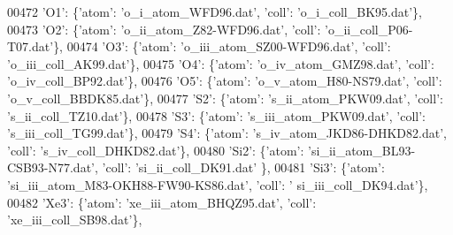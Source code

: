 \begin{DoxyCode}
00472                              \textcolor{stringliteral}{'O1'}: \{\textcolor{stringliteral}{'atom'}: \textcolor{stringliteral}{'o\_i\_atom\_WFD96.dat'}, \textcolor{stringliteral}{'coll'}: \textcolor{stringliteral}{'o\_i\_coll\_BK95.dat'}\},
00473                              \textcolor{stringliteral}{'O2'}: \{\textcolor{stringliteral}{'atom'}: \textcolor{stringliteral}{'o\_ii\_atom\_Z82-WFD96.dat'}, \textcolor{stringliteral}{'coll'}: \textcolor{stringliteral}{'o\_ii\_coll\_P06-T07.dat'}\},
00474                              \textcolor{stringliteral}{'O3'}: \{\textcolor{stringliteral}{'atom'}: \textcolor{stringliteral}{'o\_iii\_atom\_SZ00-WFD96.dat'}, \textcolor{stringliteral}{'coll'}: \textcolor{stringliteral}{'o\_iii\_coll\_AK99.dat'}\},
00475                              \textcolor{stringliteral}{'O4'}: \{\textcolor{stringliteral}{'atom'}: \textcolor{stringliteral}{'o\_iv\_atom\_GMZ98.dat'}, \textcolor{stringliteral}{'coll'}: \textcolor{stringliteral}{'o\_iv\_coll\_BP92.dat'}\},
00476                              \textcolor{stringliteral}{'O5'}: \{\textcolor{stringliteral}{'atom'}: \textcolor{stringliteral}{'o\_v\_atom\_H80-NS79.dat'}, \textcolor{stringliteral}{'coll'}: \textcolor{stringliteral}{'o\_v\_coll\_BBDK85.dat'}\},
00477                              \textcolor{stringliteral}{'S2'}: \{\textcolor{stringliteral}{'atom'}: \textcolor{stringliteral}{'s\_ii\_atom\_PKW09.dat'}, \textcolor{stringliteral}{'coll'}: \textcolor{stringliteral}{'s\_ii\_coll\_TZ10.dat'}\},
00478                              \textcolor{stringliteral}{'S3'}: \{\textcolor{stringliteral}{'atom'}: \textcolor{stringliteral}{'s\_iii\_atom\_PKW09.dat'}, \textcolor{stringliteral}{'coll'}: \textcolor{stringliteral}{'s\_iii\_coll\_TG99.dat'}\},
00479                              \textcolor{stringliteral}{'S4'}: \{\textcolor{stringliteral}{'atom'}: \textcolor{stringliteral}{'s\_iv\_atom\_JKD86-DHKD82.dat'}, \textcolor{stringliteral}{'coll'}: \textcolor{stringliteral}{'s\_iv\_coll\_DHKD82.dat'}\},
00480                              \textcolor{stringliteral}{'Si2'}: \{\textcolor{stringliteral}{'atom'}: \textcolor{stringliteral}{'si\_ii\_atom\_BL93-CSB93-N77.dat'}, \textcolor{stringliteral}{'coll'}: \textcolor{stringliteral}{'si\_ii\_coll\_DK91.dat'}
      \},
00481                              \textcolor{stringliteral}{'Si3'}: \{\textcolor{stringliteral}{'atom'}: \textcolor{stringliteral}{'si\_iii\_atom\_M83-OKH88-FW90-KS86.dat'}, \textcolor{stringliteral}{'coll'}: \textcolor{stringliteral}{'
      si\_iii\_coll\_DK94.dat'}\},
00482                              \textcolor{stringliteral}{'Xe3'}: \{\textcolor{stringliteral}{'atom'}: \textcolor{stringliteral}{'xe\_iii\_atom\_BHQZ95.dat'}, \textcolor{stringliteral}{'coll'}: \textcolor{stringliteral}{'xe\_iii\_coll\_SB98.dat'}\},

\end{DoxyCode}
